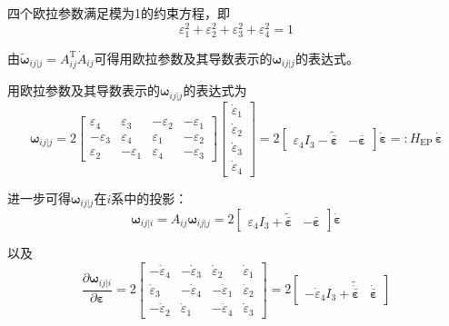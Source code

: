 四个欧拉参数满足模为1的约束方程，即
\begin{equation}
\varepsilon_1^2 + \varepsilon_2^2 + \varepsilon_3^2 + \varepsilon_4^2 = 1
\label{eq:7.7}
\end{equation}

由$\tilde{\boldsymbol{\omega}}_{ij|j} = A_{ij}^{\mathrm{T}}\dot{A}_{ij}$可得用欧拉参数及其导数表示的$\boldsymbol{\omega}_{ij|j}$的表达式。

用欧拉参数及其导数表示的$\boldsymbol{\omega}_{ij|j}$的表达式为
\begin{equation}
\boldsymbol{\omega}_{ij|j} = 2
\begin{bmatrix}
\varepsilon_4  & \varepsilon_3  & -\varepsilon_2 & -\varepsilon_1 \\[2pt]
-\varepsilon_3 & \varepsilon_4  & \varepsilon_1  & -\varepsilon_2 \\[2pt]
\varepsilon_2  & -\varepsilon_1 & \varepsilon_4  & -\varepsilon_3
\end{bmatrix}
\begin{bmatrix}
\dot{\varepsilon}_1 \\ \dot{\varepsilon}_2 \\ \dot{\varepsilon}_3 \\ \dot{\varepsilon}_4
\end{bmatrix}
= 2
\begin{bmatrix}
\varepsilon_4 I_3 - \tilde{\bar{\boldsymbol{\varepsilon}}} & -\bar{\boldsymbol{\varepsilon}}
\end{bmatrix}
\dot{\boldsymbol{\varepsilon}} =: H_{\mathrm{EP}}\,\dot{\boldsymbol{\varepsilon}}
\label{eq:7.8}
\end{equation}

进一步可得$\boldsymbol{\omega}_{ij|j}$在$i$系中的投影：
\begin{equation}
\boldsymbol{\omega}_{ij|i} = A_{ij}\boldsymbol{\omega}_{ij|j} = 2
\begin{bmatrix}
\varepsilon_4 I_3 + \tilde{\bar{\boldsymbol{\varepsilon}}} & -\bar{\boldsymbol{\varepsilon}}
\end{bmatrix}
\dot{\boldsymbol{\varepsilon}}
\end{equation}

以及
\begin{equation}
\frac{\partial\boldsymbol{\omega}_{ij|i}}{\partial\boldsymbol{\varepsilon}} = 2
\begin{bmatrix}
-\dot{\varepsilon}_4  & -\dot{\varepsilon}_3  & \dot{\varepsilon}_2  & \dot{\varepsilon}_1  \\[2pt]
\dot{\varepsilon}_3   & -\dot{\varepsilon}_4  & -\dot{\varepsilon}_1 & \dot{\varepsilon}_2  \\[2pt]
-\dot{\varepsilon}_2  & \dot{\varepsilon}_1   & -\dot{\varepsilon}_4 & \dot{\varepsilon}_3
\end{bmatrix}
= 2
\begin{bmatrix}
-\dot{\varepsilon}_4 I_3 + \tilde{\dot{\bar{\boldsymbol{\varepsilon}}}} & \dot{\bar{\boldsymbol{\varepsilon}}}
\end{bmatrix}
\label{eq:7.9}
\end{equation}

